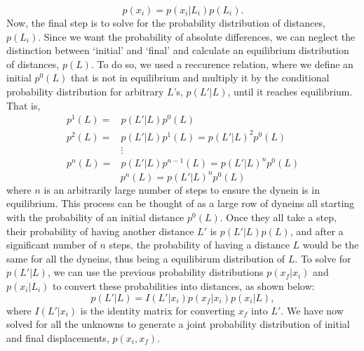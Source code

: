 \begin{equation}
	p(x_i)=p(x_i|L_i)p(L_i).
\end{equation}
Now, the final step is to solve for the probability distribution of distances, $p(L_i)$. Since we want the probability of absolute differences, we can neglect the distinction between `initial' and `final' and calculate an equilibrium distribution of distances, $p(L)$. To do so, we used a reccurence relation, where we define an initial $p^0(L)$ that is not in equilibrium and multiply it by the conditional probability distribution for arbitrary $L$'s, $p(L'|L)$, until it reaches equilibrium. That is,
\begin{align*}
	p^1(L)= & p(L'|L)p^0(L) \\
	p^2(L)= & p(L'|L)p^1(L)=p(L'|L)^2p^0(L)\\
	&\vdots \\
	p^n(L)= & p(L'|L)p^{n-1}(L)=p(L'|L)^np^0(L) 
\end{align*}
\begin{equation}
	p^n(L)=p(L'|L)^np^0(L) 	
\end{equation}
where $n$ is an arbitrarily large number of steps to ensure the dynein is in equilibrium. This process can be thought of as a large row of dyneins all starting with the probability of an initial distance $p^0(L)$. Once they all take a step, their probability of having another distance $L'$ is $p(L'|L)p(L)$, and after a significant number of $n$ steps, the probability of having a distance $L$ would be the same for all the dyneins, thus being a equilibirum distribution of $L$. To solve for $p(L'|L)$, we can use the previous probability distributions $p(x_f|x_i)$ and $p(x_i|L_i)$ to convert these probabilities into distances, as shown below:
\begin{equation}
	p(L'|L)=I(L'|x_i)p(x_f|x_i)p(x_i|L),
\end{equation}
where $I(L'|x_i)$ is the identity matrix for converting $x_f$ into $L'$. We have now solved for all the unknowns to generate a joint probability distribution of initial and final displacements, $p(x_i,x_f)$. 


